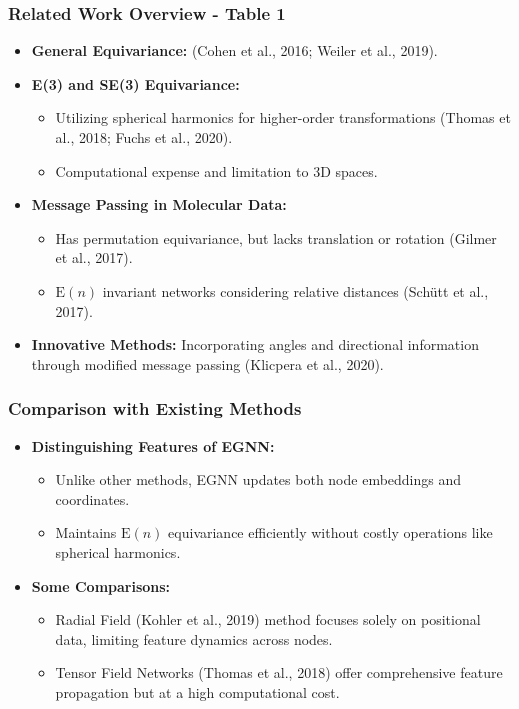 \documentclass[11pt,xcolor={dvipsnames},hyperref={pdftex,pdfpagemode=UseNone,hidelinks,pdfdisplaydoctitle=true},usepdftitle=false]{beamer}
\newcommand{\En}{\mathrm{E}(n)}
\begin{document}
\begin{frame}
    \frametitle{Related Work Overview - Table 1}
    \begin{itemize}
        \item \textbf{General Equivariance:} (Cohen et al., 2016; Weiler et al., 2019).
        \item \textbf{E(3) and SE(3) Equivariance:}
        \begin{itemize}
        \item Utilizing spherical harmonics for higher-order transformations (Thomas et al., 2018; Fuchs et al., 2020).
        \item Computational expense and limitation to 3D spaces.
        \end{itemize}
        \item \textbf{Message Passing in Molecular Data:}
        \begin{itemize}
        \item Has permutation equivariance, but lacks translation or rotation (Gilmer et al., 2017).
        \item $\En$ invariant networks considering relative distances (Schütt et al., 2017).
        \end{itemize}
        \item \textbf{Innovative Methods:} Incorporating angles and directional information through modified message passing (Klicpera et al., 2020).
    \end{itemize}
\end{frame}

\begin{frame}
\frametitle{Comparison with Existing Methods}
\begin{itemize}
    \item \textbf{Distinguishing Features of EGNN:}
    \begin{itemize}
    \item Unlike other methods, EGNN updates both node embeddings and coordinates.
    \item Maintains $\En$ equivariance efficiently without costly operations like spherical harmonics.
    \end{itemize}
    \item \textbf{Some Comparisons:}
    \begin{itemize}
    \item Radial Field (Kohler et al., 2019) method focuses solely on positional data, limiting feature dynamics across nodes.
    \item Tensor Field Networks (Thomas et al., 2018) offer comprehensive feature propagation but at a high computational cost.
    \end{itemize}
\end{itemize}
\end{frame}
\end{document}
